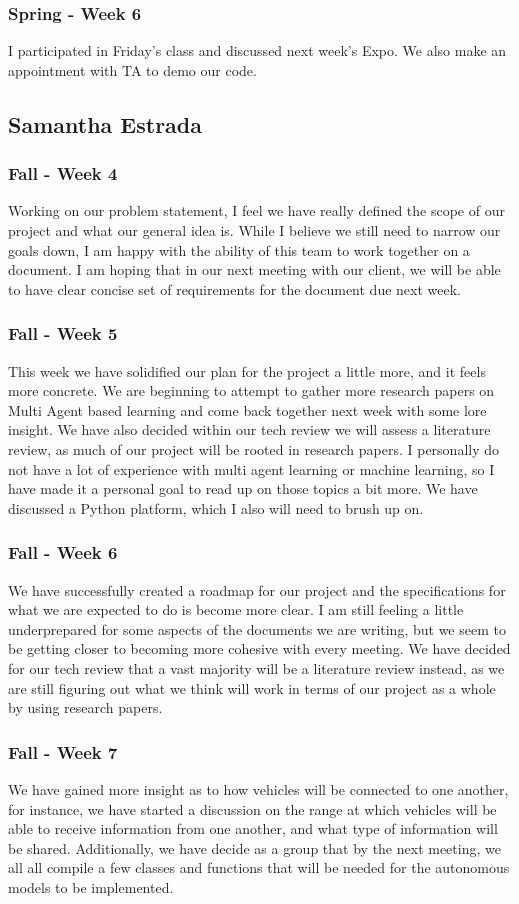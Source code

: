 \documentclass[onecolumn, draftclsnofoot,10pt, compsoc]{IEEEtran}
\begin{document}
\subsubsection{Spring - Week 6}
I participated in Friday's class and discussed next week's Expo.
We also make an appointment with TA to demo our code.
\subsection{Samantha Estrada}
\subsubsection{Fall - Week 4}
Working on our problem statement, I feel we have really defined the scope of our project and what our general idea is.
While I believe we still need to narrow our goals down, I am happy with the ability of this team to work together on a document.
I am hoping that in our next meeting with our client, we will be able to have clear concise set of requirements for the document due next week.
\subsubsection{Fall - Week 5}
This week we have solidified our plan for the project a little more, and it feels more concrete.
We are beginning to attempt to gather more research papers on Multi Agent based learning and come back together next week with some lore insight.
We have also decided within our tech review we will assess a literature review, as much of our project will be rooted in research papers.
I personally do not have a lot of experience with multi agent learning or machine learning, so I have made it a personal goal to read up on those topics a bit more.
We have discussed a Python platform, which I also will need to brush up on.
\subsubsection{Fall - Week 6}
We have successfully created a roadmap for our project and the specifications for what we are expected to do is become more clear.
I am still feeling a little underprepared for some aspects of the documents we are writing, but we seem to be getting closer to becoming more cohesive with every meeting.
We have decided for our tech review that a vast majority will be a literature review instead, as we are still figuring out what we think will work in terms of our project as a whole by using research papers.
\subsubsection{Fall - Week 7}
We have gained more insight as to how vehicles will be connected to one another, for instance, we have started a discussion on the range at which vehicles will be able to receive information from one another, and what type of information will be shared.
Additionally, we have decide as a group that by the next meeting, we all all compile a few classes and functions that will be needed for the autonomous models to be implemented.
\end{document}
